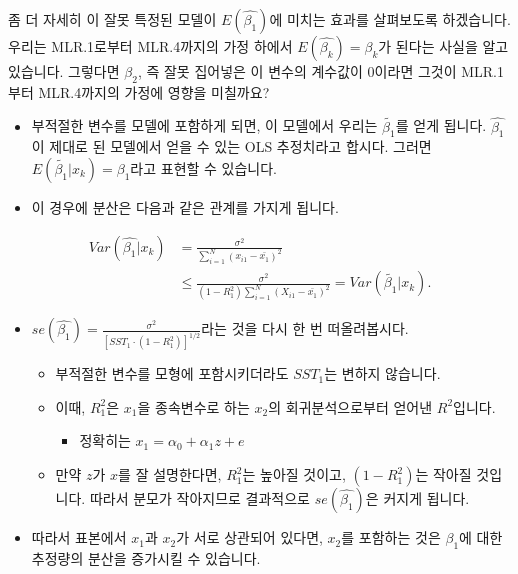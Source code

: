 \documentclass[
]{book}
\providecommand{\tightlist}{%
  \setlength{\itemsep}{0pt}\setlength{\parskip}{0pt}}
\begin{document}
좀 더 자세히 이 잘못 특정된 모델이 \(E(\hat{\beta_1})\)에 미치는 효과를 살펴보도록 하겠습니다. 우리는 MLR.1로부터 MLR.4까지의 가정 하에서 \(E(\hat{\beta_k})=\beta_k\)가 된다는 사실을 알고 있습니다. 그렇다면 \(\beta_2\), 즉 잘못 집어넣은 이 변수의 계수값이 0이라면 그것이 MLR.1부터 MLR.4까지의 가정에 영향을 미칠까요?

\begin{itemize}
\item
  부적절한 변수를 모델에 포함하게 되면, 이 모델에서 우리는 \(\tilde{\beta_1}\)를 얻게 됩니다. \(\hat{\beta_1}\)이 제대로 된 모델에서 얻을 수 있는 OLS 추정치라고 합시다. 그러면 \(E(\tilde{\beta_1}|x_k)=\beta_1\)라고 표현할 수 있습니다.
\item
  이 경우에 분산은 다음과 같은 관계를 가지게 됩니다.
\end{itemize}

\begin{equation*}
\begin{aligned}
Var(\hat{\beta_1}|x_k)&=\frac{\sigma^2}{\sum^N_{i=1}(x_{i1}-\bar{x_1})^2}\\
&\leq \frac{\sigma^2}{(1-R^2_1)\sum^N_{i=1}(X_{i1}-\bar{x_1})^2} = Var(\tilde{\beta_1}|x_k).
\end{aligned}
\end{equation*}

\begin{itemize}
\item
  \(se(\hat{\beta_1}) = \frac{\sigma^2}{[SST_1\cdot(1-R^2_1)]^{1/2}}\)라는 것을 다시 한 번 떠올려봅시다.

  \begin{itemize}
  \item
    부적절한 변수를 모형에 포함시키더라도 \(SST_1\)는 변하지 않습니다.
  \item
    이때, \(R^2_1\)은 \(x_1\)을 종속변수로 하는 \(x_2\)의 회귀분석으로부터 얻어낸 \(R^2\)입니다.

    \begin{itemize}
    \tightlist
    \item
      정확히는 \(x_1 = \alpha_0 + \alpha_1z + e\)
    \end{itemize}
  \item
    만약 \(z\)가 \(x\)를 잘 설명한다면, \(R^2_1\)는 높아질 것이고, \((1-R^2_1)\)는 작아질 것입니다. 따라서 분모가 작아지므로 결과적으로 \(se(\hat{\beta_1})\)은 커지게 됩니다.
  \end{itemize}
\item
  따라서 표본에서 \(x_1\)과 \(x_2\)가 서로 상관되어 있다면, \(x_2\)를 포함하는 것은 \(\beta_1\)에 대한 추정량의 분산을 증가시킬 수 있습니다.
\end{itemize}
\end{document}
